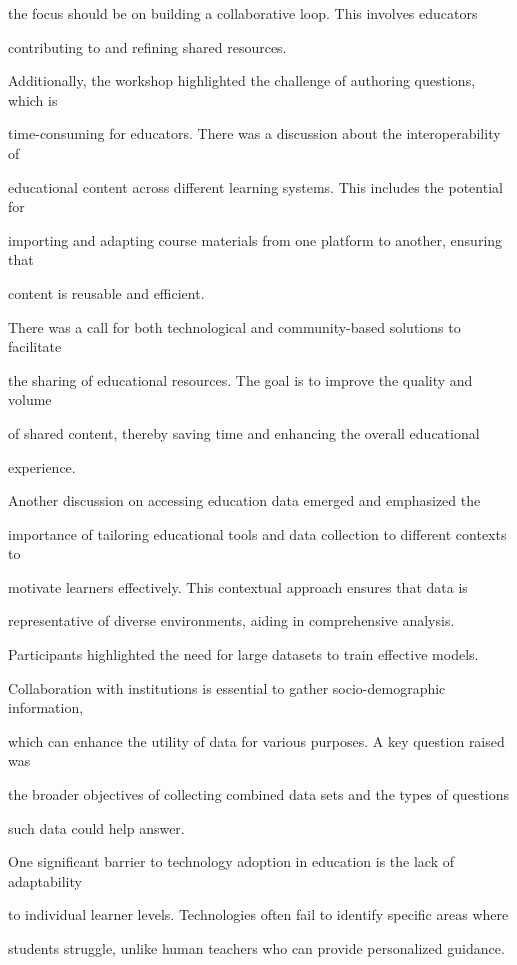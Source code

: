 \documentclass[11pt]{article}
\begin{document}
the focus should be on building a collaborative loop. This involves educators

contributing to and refining shared resources.

Additionally, the workshop highlighted the challenge of authoring questions, which is

time-consuming for educators. There was a discussion about the interoperability of

educational content across different learning systems. This includes the potential for

importing and adapting course materials from one platform to another, ensuring that

content is reusable and efficient.

There was a call for both technological and community-based solutions to facilitate

the sharing of educational resources. The goal is to improve the quality and volume

of shared content, thereby saving time and enhancing the overall educational

experience.

Another discussion on accessing education data emerged and emphasized the

importance of tailoring educational tools and data collection to different contexts to

motivate learners effectively. This contextual approach ensures that data is

representative of diverse environments, aiding in comprehensive analysis.

Participants highlighted the need for large datasets to train effective models.

Collaboration with institutions is essential to gather socio-demographic information,

which can enhance the utility of data for various purposes. A key question raised was

the broader objectives of collecting combined data sets and the types of questions

such data could help answer.

One significant barrier to technology adoption in education is the lack of adaptability

to individual learner levels. Technologies often fail to identify specific areas where

students struggle, unlike human teachers who can provide personalized guidance.
\end{document}

